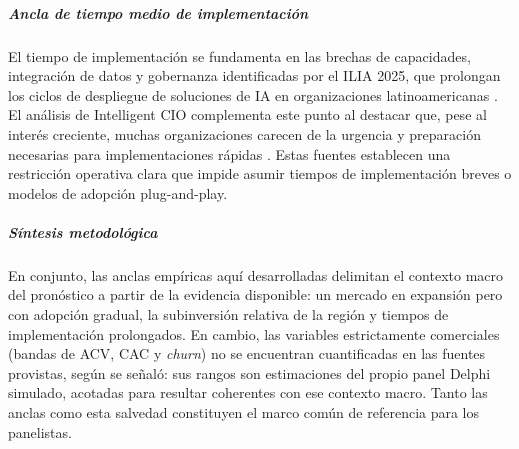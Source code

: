 \subparagraph{Ancla de tiempo medio de implementación}
El tiempo de implementación se fundamenta en las brechas de capacidades, integración de datos y gobernanza identificadas por el ILIA 2025, que prolongan los ciclos de despliegue de soluciones de IA en organizaciones latinoamericanas \cite{ILIA2025}. El análisis de Intelligent CIO complementa este punto al destacar que, pese al interés creciente, muchas organizaciones carecen de la urgencia y preparación necesarias para implementaciones rápidas \cite{IntelligentCIO2025}. Estas fuentes establecen una restricción operativa clara que impide asumir tiempos de implementación breves o modelos de adopción plug-and-play.

\subparagraph{Síntesis metodológica}
En conjunto, las anclas empíricas aquí desarrolladas delimitan el contexto macro del pronóstico a partir de la evidencia disponible: un mercado en expansión pero con adopción gradual, la subinversión relativa de la región y tiempos de implementación prolongados. En cambio, las variables estrictamente comerciales (bandas de ACV, CAC y \textit{churn}) no se encuentran cuantificadas en las fuentes provistas, según se señaló: sus rangos son estimaciones del propio panel Delphi simulado, acotadas para resultar coherentes con ese contexto macro. Tanto las anclas como esta salvedad constituyen el marco común de referencia para los panelistas.



